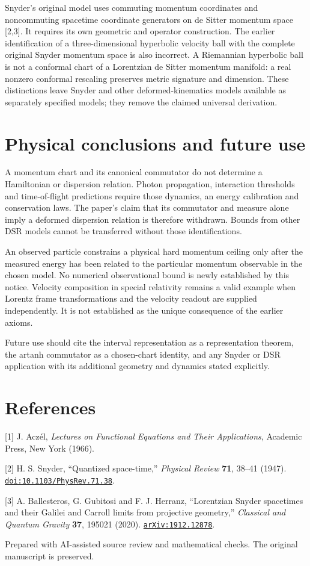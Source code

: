 \documentclass[
  11pt,
  a4paper,
]{article}
\begin{document}
Snyder's original model uses commuting momentum coordinates and noncommuting spacetime coordinate generators on de Sitter momentum space {[}2,3{]}. It requires its own geometric and operator construction. The earlier identification of a three-dimensional hyperbolic velocity ball with the complete original Snyder momentum space is also incorrect. A Riemannian hyperbolic ball is not a conformal chart of a Lorentzian de Sitter momentum manifold: a real nonzero conformal rescaling preserves metric signature and dimension. These distinctions leave Snyder and other deformed-kinematics models available as separately specified models; they remove the claimed universal derivation.

\section{Physical conclusions and future use}\label{physical-conclusions-and-future-use}

A momentum chart and its canonical commutator do not determine a Hamiltonian or dispersion relation. Photon propagation, interaction thresholds and time-of-flight predictions require those dynamics, an energy calibration and conservation laws. The paper's claim that its commutator and measure alone imply a deformed dispersion relation is therefore withdrawn. Bounds from other DSR models cannot be transferred without those identifications.

An observed particle constrains a physical hard momentum ceiling only after the measured energy has been related to the particular momentum observable in the chosen model. No numerical observational bound is newly established by this notice. Velocity composition in special relativity remains a valid example when Lorentz frame transformations and the velocity readout are supplied independently. It is not established as the unique consequence of the earlier axioms.

Future use should cite the interval representation as a representation theorem, the artanh commutator as a chosen-chart identity, and any Snyder or DSR application with its additional geometry and dynamics stated explicitly.

\section{References}\label{references}

{[}1{]} J. Aczél, \emph{Lectures on Functional Equations and Their Applications}, Academic Press, New York (1966).

{[}2{]} H. S. Snyder, ``Quantized space-time,'' \emph{Physical Review} \textbf{71}, 38--41 (1947). \href{https://doi.org/10.1103/PhysRev.71.38}{\nolinkurl{doi:10.1103/PhysRev.71.38}}.

{[}3{]} A. Ballesteros, G. Gubitosi and F. J. Herranz, ``Lorentzian Snyder spacetimes and their Galilei and Carroll limits from projective geometry,'' \emph{Classical and Quantum Gravity} \textbf{37}, 195021 (2020). \href{https://arxiv.org/abs/1912.12878}{\nolinkurl{arXiv:1912.12878}}.

Prepared with AI-assisted source review and mathematical checks. The original manuscript is preserved.
\end{document}
